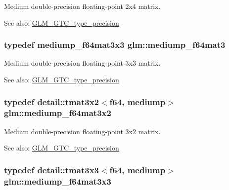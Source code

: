 Medium double-precision floating-point 2x4 matrix. \begin{Desc}
\item[See also:]\hyperlink{group__gtc__type__precision}{GLM\_\-GTC\_\-type\_\-precision} \end{Desc}
\hypertarget{group__gtc__type__precision_ge38a4a0b57e25d9cbb153dcaab9432ec}{
\subsubsection[mediump\_\-f64mat3]{\setlength{\rightskip}{0pt plus 5cm}typedef mediump\_\-f64mat3x3 {\bf glm::mediump\_\-f64mat3}}}
\label{group__gtc__type__precision_ge38a4a0b57e25d9cbb153dcaab9432ec}


Medium double-precision floating-point 3x3 matrix. \begin{Desc}
\item[See also:]\hyperlink{group__gtc__type__precision}{GLM\_\-GTC\_\-type\_\-precision} \end{Desc}
\hypertarget{group__gtc__type__precision_gd6408472435fce994a3bb9d14d321ddd}{
\subsubsection[mediump\_\-f64mat3x2]{\setlength{\rightskip}{0pt plus 5cm}typedef detail::tmat3x2$<$f64, mediump$>$ {\bf glm::mediump\_\-f64mat3x2}}}
\label{group__gtc__type__precision_gd6408472435fce994a3bb9d14d321ddd}


Medium double-precision floating-point 3x2 matrix. \begin{Desc}
\item[See also:]\hyperlink{group__gtc__type__precision}{GLM\_\-GTC\_\-type\_\-precision} \end{Desc}
\hypertarget{group__gtc__type__precision_g871b69a221dae7461aa746e6e6d372fc}{
\subsubsection[mediump\_\-f64mat3x3]{\setlength{\rightskip}{0pt plus 5cm}typedef detail::tmat3x3$<$f64, mediump$>$ {\bf glm::mediump\_\-f64mat3x3}}}
\label{group__gtc__type__precision_g871b69a221dae7461aa746e6e6d372fc}


